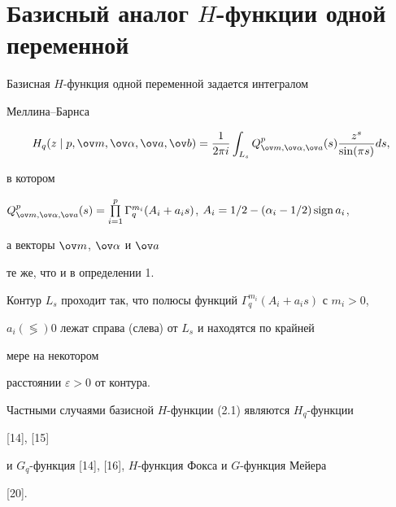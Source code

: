  


\section{Базисный аналог $H$-функции одной переменной} 


 


\begin{defn} 


Базисная $H$-функция одной переменной задается интегралом 


Меллина--Барнса 


\begin{equation} 


H_q(z\mid p,\ov m,\ov\alpha,\ov a,\ov b)= 


\frac{1}{2\pi i}\int_{L_s}Q^p_{\ov m,\ov\alpha,\ov a}(s) 


\frac{z^s}{\sin(\pi s)}ds, 


\end{equation} 


в котором 


$Q^p_{\ov m,\ov\alpha,\ov a}(s)=\prod\limits^p_{i=1} 


\Gamma^{m_i}_q(A_i+a_i s)$, $A_i=1/2-(\alpha_i-1/2)\sign a_i$, 


а векторы $\ov m$, $\ov\alpha$ и $\ov a$ 


те же, что и в определении 1. 


 


Контур $L_s$ проходит так, что полюсы функций $\Gamma^{m_i}_q(A_i+a_i 


s)$ с $m_i>0$, 


$a_i(\lessgtr)0$ лежат справа (слева) от $L_s$ и находятся по крайней 


мере на некотором 


расстоянии $\varepsilon>0$ от контура. 


\end{defn} 


 


Частными случаями базисной $H$-функции (2.1) являются $H_q$-функции 


[14], [15] 


и $G_q$-функция [14], [16], $H$-функция Фокса и $G$-функция Мейера 


[20]. 


 


